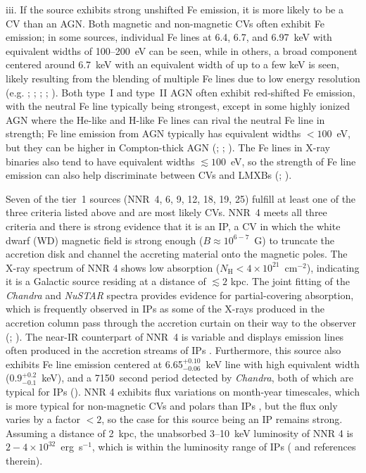 \documentclass[iop,revtex4]{emulateapj}
\begin{document}
\begin{list}{}{%
\setlength{\topsep}{0pt}%
\setlength{\leftmargin}{0.3in}%
\setlength{\listparindent}{0.0in}%
\setlength{\itemindent}{0.0in}%
\setlength{\parsep}{\parskip}%
\setlength{\itemsep}{4pt}
}
iii. If the source exhibits strong unshifted Fe emission, it is more likely to be a CV than an AGN.  Both magnetic and non-magnetic CVs often exhibit Fe emission; in some sources, individual Fe lines at 6.4, 6.7, and 6.97~keV with equivalent widths of 100--200~eV can be seen, while in others, a broad component centered around 6.7~keV with an equivalent width of up to a few keV is seen, likely resulting from the blending of multiple Fe lines due to low energy resolution (e.g. \citealt{mukai93}; \citealt{ezuka99}; \citealt{baskill05}; \citealt{bernardini12}; \citealt{xu16}).  Both type~I and type~II AGN often exhibit red-shifted Fe emission, with the neutral Fe line typically being strongest, except in some highly ionized AGN where the He-like and H-like Fe lines can rival the neutral Fe line in strength; Fe line emission from AGN typically has equivalent widths $<100$~eV, but they can be higher in Compton-thick AGN (\citealt{page04}; \citealt{iwasawa12}; \citealt{ricci14}).  The Fe lines in X-ray binaries also tend to have equivalent widths $\lesssim100$~eV, so the strength of Fe line emission can also help discriminate between CVs and LMXBs (\citealt{hirano87}; \citealt{nagase89}).  
\end{list}
\par
Seven of the tier~1 sources (NNR~4, 6, 9, 12, 18, 19, 25) fulfill at least one of the three criteria listed above and are most likely CVs.  NNR~4 meets all three criteria and there is strong evidence that it is an IP, a CV in which the white dwarf (WD) magnetic field is strong enough ($B\approx10^{6-7}$~G) to truncate the accretion disk and channel the accreting material onto the magnetic poles.  The X-ray spectrum of NNR 4 shows low absorption ($N_{\mathrm{H}}<4\times10^{21}$~cm$^{-2}$), indicating it is a Galactic source residing at a distance of $\lesssim2$ kpc.  The joint fitting of the \textit{Chandra} and \textit{NuSTAR} spectra provides evidence for partial-covering absorption, which is frequently observed in IPs as some of the X-rays produced in the accretion column pass through the accretion curtain on their way to the observer (\citealt{demartino04}; \citealt{bernardini12}).  The near-IR counterpart of NNR~4 is variable and displays emission lines often produced in the accretion streams of IPs \citep{rahoui14}.  Furthermore, this source also exhibits Fe line emission centered at 6.65$^{+0.10}_{-0.06}$~keV line with high equivalent width ($0.9^{+0.2}_{-0.1}$~keV), and a 7150~second period detected by \textit{Chandra}, both of which are typical for IPs (\citealt{scaringi10}).  NNR 4 exhibits flux variations on month-year timescales, which is more typical for non-magnetic CVs and polars than IPs \citep{ramsay04}, but the flux only varies by a factor $<2$, so the case for this source being an IP remains strong.  Assuming a distance of 2~kpc, the unabsorbed 3--10~keV luminosity of NNR 4 is $2-4\times10^{32}$~erg~s$^{-1}$, which is within the luminosity range of IPs (\citealt{muno04} and references therein).  \par
\end{document}
